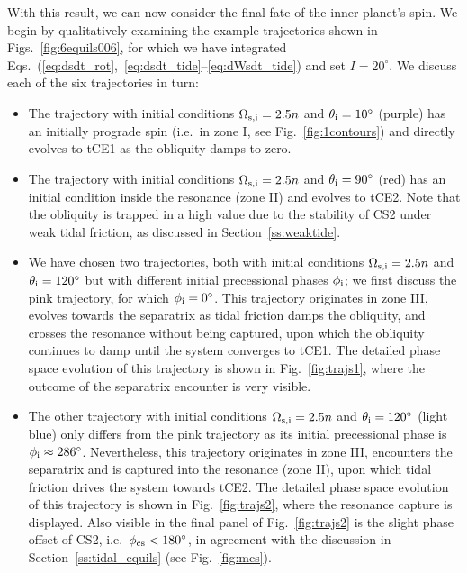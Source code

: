 \documentclass[
        fleqn,
        usenatbib,
    ]{mnras}
\begin{document}
With this result, we can now consider the final fate of the inner planet's spin.
We begin by qualitatively examining the example trajectories shown in
Figs.~\ref{fig:6equils006}, for which we have integrated
Eqs.~(\ref{eq:dsdt_rot},~\ref{eq:dsdt_tide}--\ref{eq:dWsdt_tide}) and set $I =
20^\circ$. We discuss each of the six trajectories in turn:
\begin{itemize}
    \item The trajectory with initial conditions $\Omega_{\rm s, i} = 2.5n$ and
        $\theta_{\rm i} = 10^\circ$ (purple) has an initially prograde spin
        (i.e.\ in zone I, see Fig.~\ref{fig:1contours}) and directly evolves to
        tCE1 as the obliquity damps to zero.

    \item The trajectory with initial conditions $\Omega_{\rm s, i} = 2.5n$ and
        $\theta_{\rm i} = 90^\circ$ (red) has an initial condition inside the
        resonance (zone II) and evolves to tCE2. Note that the obliquity is
        trapped in a high value due to the stability of CS2 under weak tidal
        friction, as discussed in Section~\ref{ss:weaktide}.

    \item We have chosen two trajectories, both with initial conditions
        $\Omega_{\rm s, i} = 2.5n$ and $\theta_{\rm i} = 120^\circ$ but with
        different initial precessional phases $\phi_{\rm i}$; we first discuss
        the pink trajectory, for which $\phi_{\rm i} = 0^\circ$. This trajectory
        originates in zone III, evolves towards the separatrix as tidal friction
        damps the obliquity, and crosses the resonance without being captured,
        upon which the obliquity continues to damp until the system converges to
        tCE1. The detailed phase space evolution of this trajectory is shown in
        Fig.~\ref{fig:trajs1}, where the outcome of the separatrix encounter is
        very visible.

    \item The other trajectory with initial conditions $\Omega_{\rm s, i} = 2.5n$
        and $\theta_{\rm i} = 120^\circ$ (light blue) only differs from the pink
        trajectory as its initial precessional phase is $\phi_{\rm i} \approx
        286^\circ$. Nevertheless, this trajectory originates in zone III,
        encounters the separatrix and is captured into the resonance (zone II),
        upon which tidal friction drives the system towards tCE2. The detailed
        phase space evolution of this trajectory is shown in
        Fig.~\ref{fig:trajs2}, where the resonance capture is displayed. Also
        visible in the final panel of Fig.~\ref{fig:trajs2} is the slight phase
        offset of CS2, i.e.\ $\phi_{\rm cs} < 180^\circ$, in agreement with the
        discussion in Section~\ref{ss:tidal_equils} (see Fig.~\ref{fig:mcs}).


\end{itemize}
\end{document}
